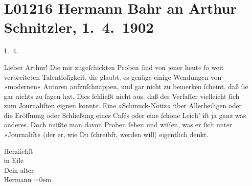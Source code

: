 

\section[Hermann Bahr an Arthur Schnitzler, 1. 4. 1902]{L01216 Hermann Bahr an Arthur Schnitzler, 1. 4. 1902}
\nopagebreak{}
\rehead{ }\normalsize\beginnumbering{}
\toendnotes[C]{\smallbreak\pagebreak[2]}
\toendnotes[C]{\smallbreak}
\pstart
           \raggedleft{}{\pb}1. 4.\pend
           
\pstart\center{}Lieber Arthur!\pend\vspace{0.5em}
\pstart
           Die mir zugeſchickten Proben ſind von jener heute ſo weit verbreiteten
               Talentloſigkeit, die glaubt, es genüge einige Wendungen von »modernen« Autoren
               aufzuſchnappen, und gar nicht zu bemerken ſcheint, daß ſie gar nichts zu ſagen hat.
               Dies ſchließt nicht aus, daß der Ver{\pb}faſſer vielleicht ſich zum
               Journaliſten eignen könnte. Eine »Schmuck-Notiz« über Allerheiligen oder die
               Eröffnung oder Schließung eines Cafés oder eine ſchöne Leich’ iſt ja ganz was
               anderes. Doch müßte man davon Proben ſehen und wiſſen, was er ſich unter »Journaliſt«
               (der er, wie Du ſchreibſt, werden will) eigentlich denkt.\pend
           
\pstart
           Herzlichſt{\\[\baselineskip]}in Eile{\\[\baselineskip]}Dein alter{\\[\baselineskip]}\spacefill\mbox{Hermann}\pend
           \leftskip=0em{}\endnumbering{}  
      